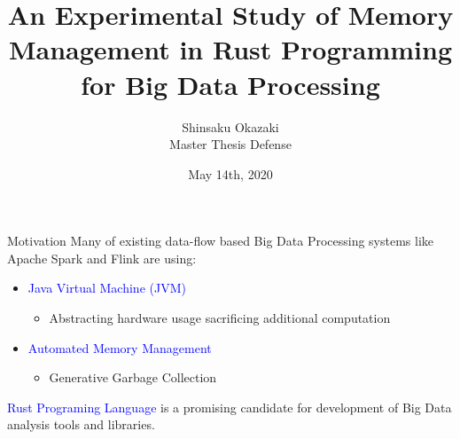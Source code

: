 \documentclass[9pt]{beamer}
\title[]{An Experimental Study of Memory Management in Rust Programming for Big Data Processing}
\date{May 14th, 2020}
\author[Shinsaku Okazaki]{Shinsaku Okazaki\\ Master Thesis Defense}
\institute[]{Supervised by: Kia Teymourian \\ Boston University}
\begin{document}
\maketitle








\begin{frame}[fragile]{Motivation}
Many of existing data-flow based Big Data Processing systems like Apache Spark and Flink are using:

    \vspace{0.5cm}
    \begin{itemize}
        \item \textcolor{blue}{Java Virtual Machine (JVM)}
        \begin{itemize}
            \item Abstracting hardware usage sacrificing additional computation
        \end{itemize}
        \item \textcolor{blue}{Automated Memory Management}
        \begin{itemize}
            \item Generative Garbage Collection
        \end{itemize}
    \end{itemize}
    \vspace{0.5cm}

\textcolor{blue}{Rust Programing Language} is a promising candidate for development of Big Data analysis tools and libraries.



\end{frame}


\end{document}
